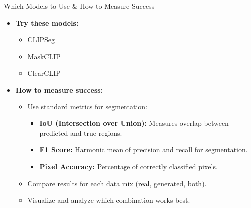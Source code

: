   \begin{refsection}
  \begin{frame}{Which Models to Use \& How to Measure Success}
    \begin{itemize}
      \item \textbf{Try these models:}
        \begin{itemize}
          \item CLIPSeg~\parencite{luddeckeImageSegmentationUsing2022}
          \item MaskCLIP~\parencite{zhouExtractFreeDense2022}
          \item ClearCLIP~\parencite{lanClearCLIPDecomposingCLIP2024}
        \end{itemize}
      \item \textbf{How to measure success:}
      \begin{itemize}
        \item Use standard metrics for segmentation:
          \begin{itemize}
            \item \textbf{IoU (Intersection over Union):} Measures overlap between predicted and true regions.
            \item \textbf{F1 Score:} Harmonic mean of precision and recall for segmentation.
            \item \textbf{Pixel Accuracy:} Percentage of correctly classified pixels.
          \end{itemize}
        \item Compare results for each data mix (real, generated, both).
        \item Visualize and analyze which combination works best.
      \end{itemize}
    \end{itemize}
    \bottomleftrefs
  \end{frame}
  \end{refsection}
